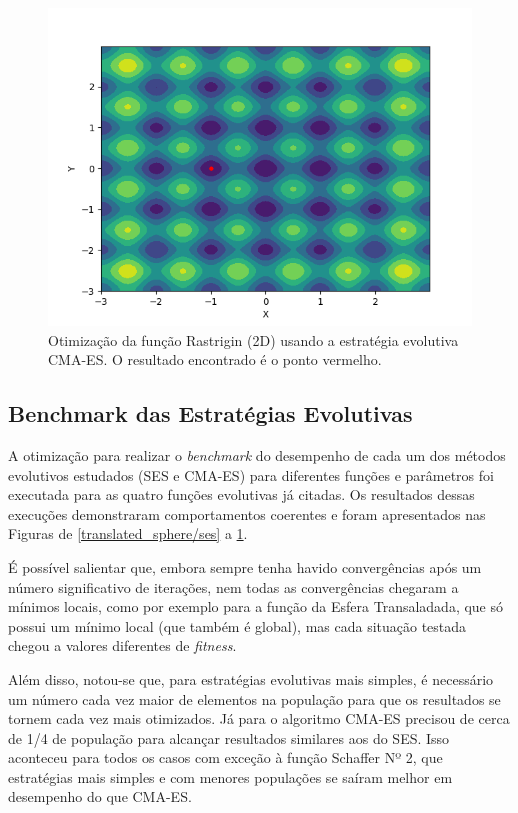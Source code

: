 \documentclass[conference]{IEEEtran}
\begin{document}
\begin{figure}[htbp]
\centering
\centerline{\includegraphics[scale=0.5]{imagens/rastrigin/cmaes.png}}
\caption{Otimização da função Rastrigin (2D) usando a estratégia evolutiva CMA-ES. O resultado encontrado é o ponto vermelho.}
\label{rastrigin/cmaes}
\end{figure}

\subsection{Benchmark das Estratégias Evolutivas}

A otimização para realizar o \textit{benchmark} do desempenho de cada um dos métodos evolutivos estudados (SES e CMA-ES) para diferentes funções e parâmetros foi executada para as quatro funções evolutivas já citadas. Os resultados dessas execuções demonstraram comportamentos coerentes e foram apresentados nas Figuras de \ref{translated_sphere/ses} a \ref{rastrigin/cmaes}.

É possível salientar que, embora sempre tenha havido convergências após um número significativo de iterações, nem todas as convergências chegaram a mínimos locais, como por exemplo para a função da Esfera Transaladada, que só possui um mínimo local (que também é global), mas cada situação testada chegou a valores diferentes de \textit{fitness}.

Além disso, notou-se que, para estratégias evolutivas mais simples, é necessário um número cada vez maior de elementos na população para que os resultados se tornem cada vez mais otimizados. Já para o algoritmo CMA-ES precisou de cerca de 1/4 de população para alcançar resultados similares aos do SES. Isso aconteceu para todos os casos com exceção à função Schaffer Nº 2, que estratégias mais simples e com menores populações se saíram melhor em desempenho do que CMA-ES.
\end{document}
